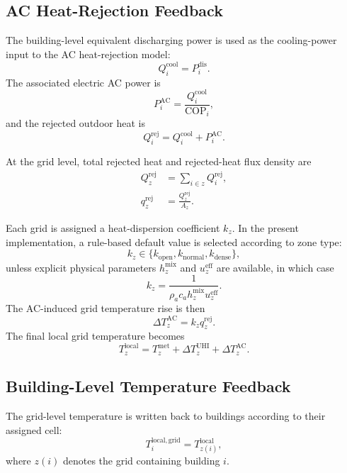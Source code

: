 \documentclass[conference]{IEEEtran}
\begin{document}
\subsection{AC Heat-Rejection Feedback}
The building-level equivalent discharging power is used as the cooling-power input to the AC heat-rejection model:
\begin{equation}
    Q^{\mathrm{cool}}_i = P^{\mathrm{dis}}_i.
\end{equation}
The associated electric AC power is
\begin{equation}
    P^{\mathrm{AC}}_i = \frac{Q^{\mathrm{cool}}_i}{\mathrm{COP}_i},
\end{equation}
and the rejected outdoor heat is
\begin{equation}
    Q^{\mathrm{rej}}_i = Q^{\mathrm{cool}}_i + P^{\mathrm{AC}}_i.
\end{equation}

At the grid level, total rejected heat and rejected-heat flux density are
\begin{align}
    Q^{\mathrm{rej}}_z &= \sum_{i \in z} Q^{\mathrm{rej}}_i, \\
    q^{\mathrm{rej}}_z &= \frac{Q^{\mathrm{rej}}_z}{A_z}.
\end{align}

Each grid is assigned a heat-dispersion coefficient $k_z$. In the present implementation, a rule-based default value is selected according to zone type:
\begin{equation}
    k_z \in \{k_{\mathrm{open}}, k_{\mathrm{normal}}, k_{\mathrm{dense}}\},
\end{equation}
unless explicit physical parameters $h^{\mathrm{mix}}_z$ and $u^{\mathrm{eff}}_z$ are available, in which case
\begin{equation}
    k_z = \frac{1}{\rho_a c_a h^{\mathrm{mix}}_z u^{\mathrm{eff}}_z}.
\end{equation}
The AC-induced grid temperature rise is then
\begin{equation}
    \Delta T^{\mathrm{AC}}_z = k_z q^{\mathrm{rej}}_z.
\end{equation}
The final local grid temperature becomes
\begin{equation}
    T^{\mathrm{local}}_z = T^{\mathrm{met}}_z + \Delta T^{\mathrm{UHI}}_z + \Delta T^{\mathrm{AC}}_z.
\end{equation}

\subsection{Building-Level Temperature Feedback}
The grid-level temperature is written back to buildings according to their assigned cell:
\begin{equation}
    T^{\mathrm{local,grid}}_i = T^{\mathrm{local}}_{z(i)},
\end{equation}
where $z(i)$ denotes the grid containing building $i$.
\end{document}
